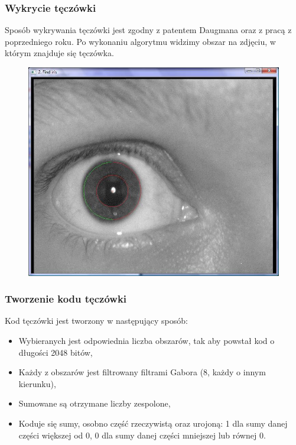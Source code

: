 \documentclass{beamer}
\begin{document}
\begin{frame}
\frametitle{Wykrycie tęczówki}
Sposób wykrywania tęczówki jest zgodny z patentem Daugmana oraz z pracą z poprzedniego roku. Po wykonaniu algorytmu widzimy obszar na zdjęciu, w którym znajduje się tęczówka.
\begin{figure}
\begin{center}
\includegraphics[scale=0.25]{teczowka_nasza.jpg}
\end{center}
\end{figure}
\end{frame}


\begin{frame}
\frametitle{Tworzenie kodu tęczówki}
Kod tęczówki jest tworzony w następujący sposób:
\begin{itemize}
\item Wybieranych jest odpowiednia liczba obszarów, tak aby powstał kod o długości 2048 bitów,
\item Każdy z obszarów jest filtrowany filtrami Gabora (8, każdy o innym kierunku),
\item Sumowane są otrzymane liczby zespolone,
\item Koduje się sumy, osobno część rzeczywistą oraz urojoną: 1 dla sumy danej części większej od 0, 0 dla sumy danej części mniejszej lub równej 0.
\end{itemize}
\end{frame}
\end{document}
